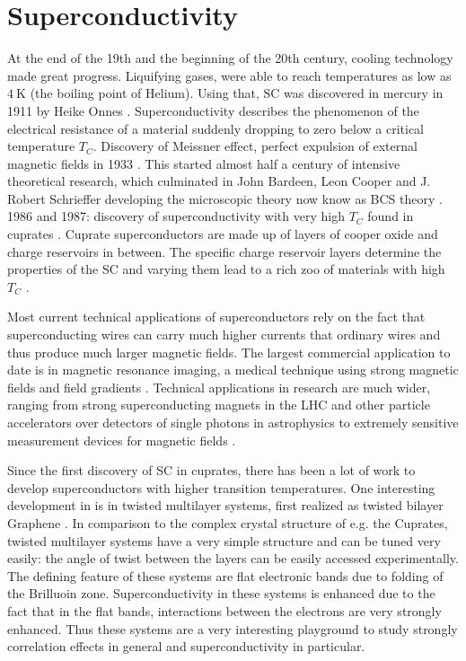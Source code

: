 \documentclass[../notes.tex]{subfiles}
\begin{document}
\chapter{Superconductivity}

At the end of the 19th and the beginning of the 20th century, cooling technology made great progress.
Liquifying gases, were able to reach temperatures as low as \(\qty{4}{\kelvin}\) (the boiling point of Helium).
Using that, SC was discovered in mercury in 1911 by Heike Onnes \cite{onnesFurtherExperimentsLiquid1991}.
Superconductivity describes the phenomenon of the electrical resistance of a material suddenly dropping to zero below a critical temperature \(T_C\).
Discovery of Meissner effect, perfect expulsion of external magnetic fields in 1933 \cite{meissnerNeuerEffektBei1933}.
This started almost half a century of intensive theoretical research, which culminated in John Bardeen, Leon Cooper and J. Robert Schrieffer developing the microscopic theory now know as BCS theory \cite{bardeenTheorySuperconductivity1957}.
1986 and 1987: discovery of superconductivity with very high \(T_C\) found in cuprates \cite{bednorzPossibleHighTc1986,uchidaHighTcSuperconductivity1987}.
Cuprate superconductors are made up of layers of cooper oxide and charge reservoirs in between.
The specific charge reservoir layers determine the properties of the SC and varying them lead to a rich zoo of materials with high \(T_C\)  \cite{rybickiPerspectivePhaseDiagram2016}.

Most current technical applications of superconductors rely on the fact that superconducting wires can carry much higher currents that ordinary wires and thus produce much larger magnetic fields.
The largest commercial application to date is in magnetic resonance imaging, a medical technique using strong magnetic fields and field gradients \cite{rinckMagneticResonanceMedicine}.
Technical applications in research are much wider, ranging from strong superconducting magnets in the LHC \cite{tollestrupDevelopmentSuperconductingMagnets2008} and other particle accelerators over detectors of single photons in astrophysics \cite{irwinTransitionEdgeSensors2005} to extremely sensitive measurement devices for magnetic fields \cite{koelleHightransitiontemperatureSuperconductingQuantum1999, faleyHighTcSQUIDBiomagnetometers2017}.

Since the first discovery of SC in cuprates, there has been a lot of work to develop superconductors with higher transition temperatures.
One interesting development in is in twisted multilayer systems, first realized as twisted bilayer Graphene \cite{caoUnconventionalSuperconductivityMagicangle2018}.
In comparison to the complex crystal structure of e.g. the Cuprates, twisted multilayer systems have a very simple structure and can be tuned very easily: the angle of twist between the layers can be easily accessed experimentally.
The defining feature of these systems are flat electronic bands due to folding of the Brilluoin zone.
Superconductivity in these systems is enhanced due to the fact that in the flat bands, interactions between the electrons are very strongly enhanced.
Thus these systems are a very interesting playground to study strongly correlation effects in general and superconductivity in particular.
\end{document}
